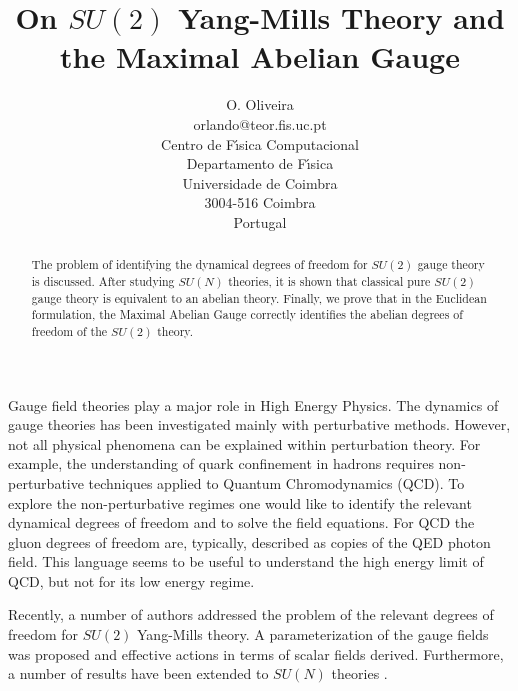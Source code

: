 \documentclass[a4paper,a4paper]{article}
\begin{document}
\title{On $SU(2)$ Yang-Mills Theory and the Maximal Abelian Gauge}
\author{O. Oliveira \\
        orlando@teor.fis.uc.pt \\
        Centro de F\'{\i}sica Computacional \\
        Departamento de F\'{\i}sica \\
        Universidade de Coimbra \\
        3004-516 Coimbra \\
        Portugal }

\maketitle

\begin{abstract}
The problem of identifying the dynamical degrees of freedom for $SU(2)$
gauge theory is discussed. After studying $SU(N)$ theories, 
it is shown that classical pure $SU(2)$ gauge theory is equivalent to an
abelian theory. Finally, we prove that in the Euclidean formulation, the 
Maximal Abelian Gauge correctly identifies the abelian degrees of freedom 
of the $SU(2)$ theory.
\end{abstract}



Gauge field theories play a major role in High Energy Physics. The dynamics
of gauge theories has been investigated mainly with perturbative methods. 
However, not all 
physical phenomena can be explained within perturbation theory. 
For example, the understanding of quark confinement in hadrons
requires non-perturbative techniques applied to Quantum Chromodynamics (QCD).
To explore the non-perturbative regimes one would like to 
identify the relevant dynamical degrees of freedom and to solve the field
equations. For QCD the gluon degrees of freedom are, typically, described as
copies of the QED photon field. This language seems to be useful to 
understand the high energy limit of QCD, but not for its
low energy regime.

Recently, a number of authors \cite{FaNi98,Cho99,Sha} addressed the problem 
of the relevant degrees of freedom for $SU(2)$ Yang-Mills theory. 
A  parameterization of the gauge fields was proposed and effective actions
in terms of scalar fields derived. Furthermore, a number of 
results have been extended to $SU(N)$ theories \cite{FaNi98a,FaNi99,Li99}.
\end{document}
